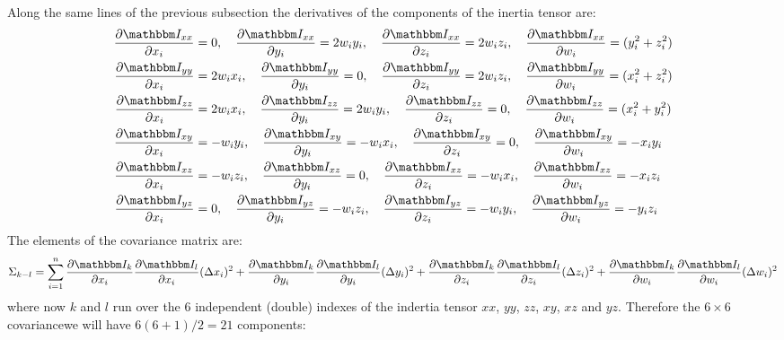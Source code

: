 \documentclass[a4paper,11pt]{article}
\newcommand{\pder}[2]{\frac{\partial#1}{\partial#2}}
\newcommand{\itm}{\mathbbm I}
\newcommand{\itc}[1]{\itm_{#1}}
\begin{document}
Along the same lines of the previous subsection the derivatives of the
components of the inertia tensor are:
\begin{align}
\pder{\itc{xx}}{x_i} &= 0,\quad
\pder{\itc{xx}}{y_i}  = 2w_iy_i,\quad
\pder{\itc{xx}}{z_i}  = 2w_iz_i,\quad
\pder{\itc{xx}}{w_i}  = (y_i^2 + z_i^2)\\
\pder{\itc{yy}}{x_i} &= 2w_ix_i,\quad
\pder{\itc{yy}}{y_i}  = 0,\quad
\pder{\itc{yy}}{z_i}  = 2w_iz_i,\quad
\pder{\itc{yy}}{w_i}  = (x_i^2 + z_i^2)\\
\pder{\itc{zz}}{x_i} &= 2w_ix_i,\quad
\pder{\itc{zz}}{y_i}  = 2w_iy_i,\quad
\pder{\itc{zz}}{z_i}  = 0,\quad
\pder{\itc{zz}}{w_i}  = (x_i^2 + y_i^2)\\
\pder{\itc{xy}}{x_i} &= -w_iy_i,\quad
\pder{\itc{xy}}{y_i}  = -w_ix_i,\quad
\pder{\itc{xy}}{z_i}  = 0,\quad
\pder{\itc{xy}}{w_i}  = -x_iy_i\\
\pder{\itc{xz}}{x_i} &= -w_iz_i,\quad
\pder{\itc{xz}}{y_i}  = 0,\quad
\pder{\itc{xz}}{z_i}  = -w_ix_i,\quad
\pder{\itc{xz}}{w_i}  = -x_iz_i\\
\pder{\itc{yz}}{x_i} &= 0,\quad
\pder{\itc{yz}}{y_i}  = -w_iz_i,\quad
\pder{\itc{yz}}{z_i}  = -w_iy_i,\quad
\pder{\itc{yz}}{w_i}  = -y_iz_i
\end{align}
The elements of the covariance matrix are:
\begin{equation}
  \Sigma_{k-l} = \sum_{i=1}^n 
  \pder{\itc{k}}{x_i}\pder{\itc{l}}{x_i}(\Delta x_i)^2 +
  \pder{\itc{k}}{y_i}\pder{\itc{l}}{y_i}(\Delta y_i)^2 +
  \pder{\itc{k}}{z_i}\pder{\itc{l}}{z_i}(\Delta z_i)^2 +
  \pder{\itc{k}}{w_i}\pder{\itc{l}}{w_i}(\Delta w_i)^2
\end{equation}
where now $k$ and $l$ run over the 6 independent (double) indexes of the
indertia tensor $xx$, $yy$, $zz$, $xy$, $xz$ and $yz$. Therefore the
$6\times6$ covariancewe will have $6(6+1)/2 = 21$ components:
\end{document}
